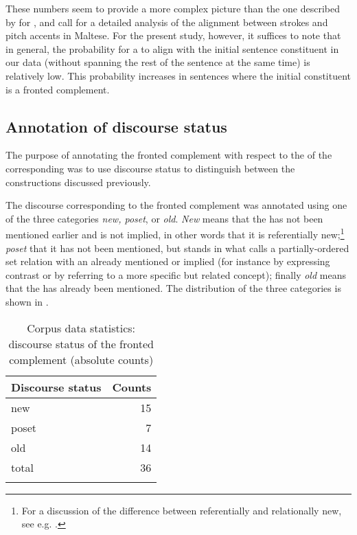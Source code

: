 \documentclass[output=paper]{LSP/langsci}
\begin{document}
These numbers seem to provide a more complex picture than the one
described by \citet{Ebertetal11} for , and call for a detailed
analysis of the alignment between  strokes and pitch accents in
Maltese. For the present study, however, it suffices to note that in
general, the probability for a  to align with the initial
sentence constituent in our data (without spanning the rest of the
sentence at the same time) is relatively low. This probability
increases in sentences where the initial constituent is
a fronted complement.


\subsection{Annotation of discourse status}

The purpose of annotating the fronted complement with respect to the
 of the corresponding  was to use discourse
status to distinguish between the constructions discussed
previously.


The discourse  corresponding to the fronted complement was
annotated using one of the three categories {\em new, poset}, or {\em
  old}. {\em New} means that the  has not been mentioned
earlier and is not implied, in other words that it is referentially new;\footnote{For a discussion of the difference between referentially and relationally new, see e.g. \cite{GundelFretheim08}.} {\em poset} that it has not been
mentioned, but stands in what \citet{Prince1981a} calls a
partially-ordered set relation with an already mentioned or implied
 (for instance by expressing contrast or by referring to a
more specific but related concept); finally {\em old} means that the
 has already been mentioned. The distribution of the three
categories is shown in .


\begin{table}
  \begin{tabular}{lr}
    \lsptoprule
 Discourse status     & Counts \\
    \midrule
new & 15   \\
poset & 7    \\
old & 14    \\
    \midrule
total & 36    \\
\lspbottomrule
  \end{tabular}
  \caption{Corpus data statistics: discourse status of the fronted complement (absolute counts)}
  \label{tab:paggio:discourse_stats}
\end{table}
\end{document}
